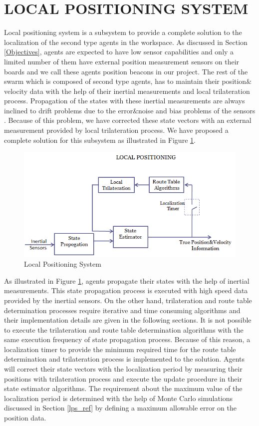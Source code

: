 \section{LOCAL POSITIONING SYSTEM} \label{LOCAL POSITIONING SYSTEMS_ref}
Local positioning system is a subsystem to provide a complete solution to the localization of the second type agents in the workspace. As discussed in Section \ref{Objectives}, agents are expected to have low sensor capabilities and only a limited number of them have external position measurement sensors on their boards and we call these agents position beacons in our project. The rest of the swarm which is composed of second type agents, has to maintain their position$\&$velocity data with the help of their inertial measurements and local trilateration process. Propagation of the states with these inertial measurements are always inclined to drift problems due to the error$\&$noise and bias problems of the sensors \cite{91}. Because of this problem, we have corrected these state vectors with an external measurement provided by local trilateration process. We have proposed a complete solution for this subsystem as illustrated in Figure \ref{figure_lps}.

\begin{figure}[H]
\caption{Local Positioning System} \label{figure_lps}
\centering
\includegraphics[scale = 0.60]{lps}
\end{figure}

As illustrated in Figure \ref{figure_lps}, agents propagate their states with the help of inertial measurements. This state propagation process is executed with high speed data provided by the inertial sensors. On the other hand, trilateration and route table determination processes require iterative and time consuming algorithms and their implementation details are given in the following sections. It is not possible to execute the trilateration and route table determination algorithms with the same execution frequency of state propagation process. Because of this reason, a localization timer to provide the minimum required time for the route table determination and trilateration process is implemented to the solution. Agents will correct their state vectors with the localization period by measuring their positions with trilateration process and execute the update procedure in their state estimator algorithms. The requirement about the maximum value of the localization period is determined with the help of Monte Carlo simulations discussed in Section \ref{lps_ref} by defining a maximum allowable error on the position data. 

